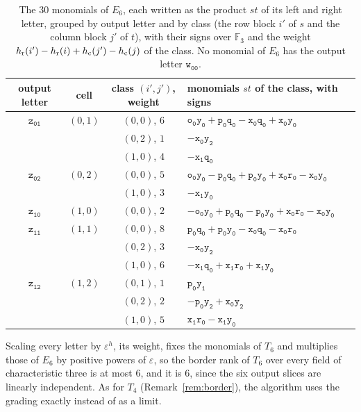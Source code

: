 \documentclass[11pt]{article}
\theoremstyle{definition}
\theoremstyle{remark}
\newcommand{\F}{\mathbb{F}}
\newcommand{\eps}{\varepsilon}
\newcommand{\tl}[1]{\mathtt{#1}}
\begin{document}
\begin{table}[ht]
\centering\small
\renewcommand{\arraystretch}{1.15}
\begin{tabular}{@{}cccl@{}}
\toprule
output letter & cell & class $(i',j')$, weight & monomials $st$ of the class, with signs\\
\midrule
$\tl{z_{01}}$ & $(0,1)$ & $(0,0)$, $6$ & $\tl{o_0y_0}+\tl{p_0q_0}-\tl{x_0q_0}+\tl{x_0y_0}$\\
 & & $(0,2)$, $1$ & $-\tl{x_0y_2}$\\
 & & $(1,0)$, $4$ & $-\tl{x_1q_0}$\\
$\tl{z_{02}}$ & $(0,2)$ & $(0,0)$, $5$ & $\tl{o_0y_0}-\tl{p_0q_0}+\tl{p_0y_0}+\tl{x_0r_0}-\tl{x_0y_0}$\\
 & & $(1,0)$, $3$ & $-\tl{x_1y_0}$\\
$\tl{z_{10}}$ & $(1,0)$ & $(0,0)$, $2$ & $-\tl{o_0y_0}+\tl{p_0q_0}-\tl{p_0y_0}+\tl{x_0r_0}-\tl{x_0y_0}$\\
$\tl{z_{11}}$ & $(1,1)$ & $(0,0)$, $8$ & $\tl{p_0q_0}+\tl{p_0y_0}-\tl{x_0q_0}-\tl{x_0r_0}$\\
 & & $(0,2)$, $3$ & $-\tl{x_0y_2}$\\
 & & $(1,0)$, $6$ & $-\tl{x_1q_0}+\tl{x_1r_0}+\tl{x_1y_0}$\\
$\tl{z_{12}}$ & $(1,2)$ & $(0,1)$, $1$ & $\tl{p_0y_1}$\\
 & & $(0,2)$, $2$ & $-\tl{p_0y_2}+\tl{x_0y_2}$\\
 & & $(1,0)$, $5$ & $\tl{x_1r_0}-\tl{x_1y_0}$\\
\bottomrule
\end{tabular}
\caption{The $30$ monomials of $E_6$, each written as the product $st$ of its left and right letter, grouped by output letter and by class (the row block $i'$ of $s$ and the column block $j'$ of $t$), with their signs over $\F_3$ and the weight $h_{\rm r}(i')-h_{\rm r}(i)+h_{\rm c}(j')-h_{\rm c}(j)$ of the class. No monomial of $E_6$ has the output letter $\tl{w_{00}}$.}\label{tab:E6}
\end{table}

Scaling every letter by $\eps^{h}$, its weight, fixes the monomials of $T_6$ and multiplies those of $E_6$ by positive powers of $\eps$, so the border rank of $T_6$ over every field of characteristic three is at most $6$, and it is $6$, since the six output slices are linearly independent. As for $T_4$ (Remark~\ref{rem:border}), the algorithm uses the grading exactly instead of as a limit.
\end{document}

